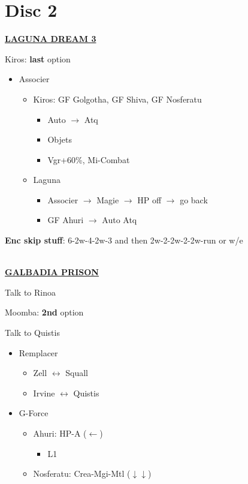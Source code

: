 \chapter{Disc 2}

\underline{\textbf{LAGUNA DREAM 3}}

Kiros: \textbf{last} option

\begin{menu}
	\begin{itemize}
		\item Associer
			\begin{itemize}
				\item Kiros: GF Golgotha, GF Shiva, GF Nosferatu
					\begin{itemize}
						\item Auto $\rightarrow$ Atq
						\item Objets
						\item Vgr+60\%, Mi-Combat
					\end{itemize}
				\item Laguna
					\begin{itemize}
						\item Associer $\rightarrow$ Magie $\rightarrow$ HP off  $\rightarrow$ go back
						\item GF Ahuri  $\rightarrow$ Auto Atq
					\end{itemize}
			\end{itemize}
	\end{itemize}
\end{menu}

\textbf{Enc skip stuff}: 6-2w-4-2w-3 and then 2w-2-2w-2-2w-run or w/e

\leavevmode\\
\underline{\textbf{GALBADIA PRISON}}

Talk to Rinoa

Moomba: \textbf{2nd} option

Talk to Quistis

\begin{menu}
	\begin{itemize}
		\item Remplacer
			\begin{itemize}
				\item Zell $\leftrightarrow$ Squall
				\item Irvine $\leftrightarrow$ Quistis
			\end{itemize}
		\item G-Force
			\begin{itemize}
				\item Ahuri: HP-A ($\leftarrow$)
					\begin{itemize}
						\item L1
					\end{itemize}
				\item Nosferatu: Crea-Mgi-Mtl ($\downarrow\downarrow$)
			\end{itemize}
	\end{itemize}
\end{menu}

